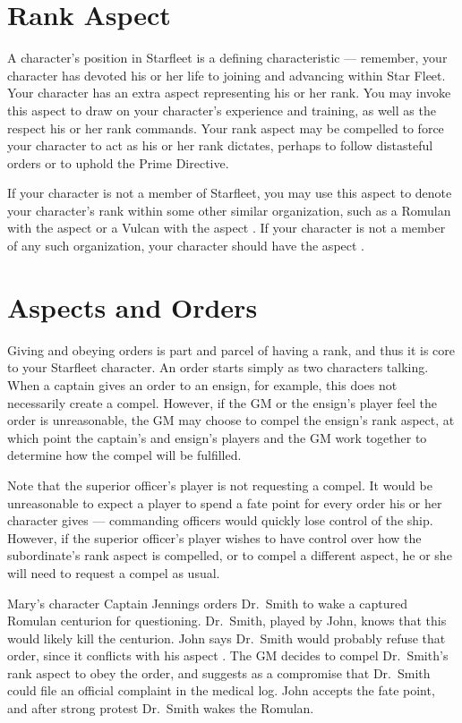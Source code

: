 \documentclass[12pt,titlepage,openany]{book}
\begin{document}
\section{Rank Aspect}\label{sec:rank}

A character's position in Starfleet is a defining characteristic --- remember,
your character has devoted his or her life to joining and advancing within Star
Fleet. Your character has an extra aspect representing his or her rank. You may
invoke this aspect to draw on your character's experience and training, as well
as the respect his or her rank commands. Your rank aspect may be compelled to
force your character to act as his or her rank dictates, perhaps to follow
distasteful orders or to uphold the Prime Directive.

If your character is not a member of Starfleet, you may use this aspect to
denote your character's rank within some other similar organization, such as a
Romulan with the aspect  or a Vulcan with the aspect
. If your character is not a member of any such
organization, your character should have the aspect .

\section{Aspects and Orders}\label{sec:aspects-orders}

Giving and obeying orders is part and parcel of having a rank, and thus it is
core to your Starfleet character. An order starts simply as two characters
talking. When a captain gives an order to an ensign, for example, this does not
necessarily create a compel. However, if the GM or the ensign's player feel the
order is unreasonable, the GM may choose to compel the ensign's rank aspect, at
which point the captain's and ensign's players and the GM work together to
determine how the compel will be fulfilled.

Note that the superior officer's player is not requesting a compel. It would be
unreasonable to expect a player to spend a fate point for every order his or
her character gives --- commanding officers would quickly lose control of the
ship. However, if the superior officer's player wishes to have control over
how the subordinate's rank aspect is compelled, or to compel a different
aspect, he or she will need to request a compel as usual.

\begin{example}
    Mary's character Captain Jennings orders Dr.\ Smith to wake a captured
    Romulan centurion for questioning. Dr.\ Smith, played by John, knows that
    this would likely kill the centurion. John says Dr.\ Smith would probably
    refuse that order, since it conflicts with his aspect .
    The GM decides to compel Dr.\ Smith's rank aspect  to
    obey the order, and suggests as a compromise that Dr.\ Smith could file an
    official complaint in the medical log. John accepts the fate point, and
    after strong protest Dr.\ Smith wakes the Romulan.
\end{example}
\end{document}
